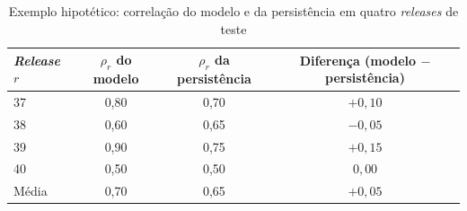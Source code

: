 \begin{table}[htbp]
    \centering
    \footnotesize
    \caption{Exemplo hipotético: correlação do modelo e da persistência em quatro \textit{releases} de teste}
    \label{tab:met-ex-pareada}
    \begin{tabular}{lccc}
        \toprule
        \textit{Release} $r$ & $\rho_r$ do modelo & $\rho_r$ da persistência & Diferença (modelo $-$ persistência) \\
        \midrule
        37 & 0,80 & 0,70 & $+0{,}10$ \\
        38 & 0,60 & 0,65 & $-0{,}05$ \\
        39 & 0,90 & 0,75 & $+0{,}15$ \\
        40 & 0,50 & 0,50 & $0{,}00$ \\
        \midrule
        Média & 0,70 & 0,65 & $+0{,}05$ \\
        \bottomrule
    \end{tabular}
\end{table}%
